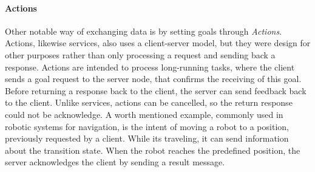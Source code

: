 \paragraph{Actions}

Other notable way of exchanging data is by setting goals through \textit{Actions}. Actions, likewise services, also uses a client-server model, but they were design for other purposes rather than only processing a request and sending back a response. Actions are intended to process long-running tasks, where the client sends a goal request to the server node, that confirms the receiving of this goal. Before returning a response back to the client, the server can send feedback back to the client. Unlike services, actions can be cancelled, so the return response could not be acknowledge. A worth mentioned example, commonly used in robotic systems for navigation, is the intent of moving a robot to a position, previously requested by a client. While its traveling, it can send information about the transition state. When the robot reaches the predefined position, the server acknowledges the client by sending a result message.

% 
%                 
% 

               
